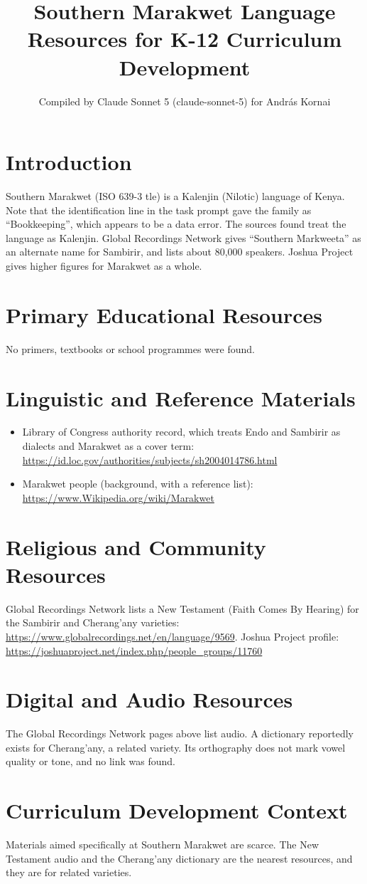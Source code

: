 \documentclass[12pt]{article}
\title{Southern Marakwet Language Resources for K-12 Curriculum Development}
\author{Compiled by Claude Sonnet 5 (claude-sonnet-5) for Andr\'as Kornai}
\date{}
\begin{document}
\maketitle

\section{Introduction}
Southern Marakwet (ISO 639-3 tle) is a Kalenjin (Nilotic) language of Kenya. Note that the identification line in the task prompt gave the family as ``Bookkeeping'', which appears to be a data error. The sources found treat the language as Kalenjin. Global Recordings Network gives ``Southern Markweeta'' as an alternate name for Sambirir, and lists about 80,000 speakers. Joshua Project gives higher figures for Marakwet as a whole.

\section{Primary Educational Resources}
No primers, textbooks or school programmes were found.

\section{Linguistic and Reference Materials}
\begin{itemize}
\item Library of Congress authority record, which treats Endo and Sambirir as dialects and Marakwet as a cover term: \url{https://id.loc.gov/authorities/subjects/sh2004014786.html}
\item Marakwet people (background, with a reference list): \url{https://www.Wikipedia.org/wiki/Marakwet}
\end{itemize}

\section{Religious and Community Resources}
Global Recordings Network lists a New Testament (Faith Comes By Hearing) for the Sambirir and Cherang'any varieties: \url{https://www.globalrecordings.net/en/language/9569}. Joshua Project profile: \url{https://joshuaproject.net/index.php/people_groups/11760}

\section{Digital and Audio Resources}
The Global Recordings Network pages above list audio. A dictionary reportedly exists for Cherang'any, a related variety. Its orthography does not mark vowel quality or tone, and no link was found.

\section{Curriculum Development Context}
Materials aimed specifically at Southern Marakwet are scarce. The New Testament audio and the Cherang'any dictionary are the nearest resources, and they are for related varieties.
\end{document}

